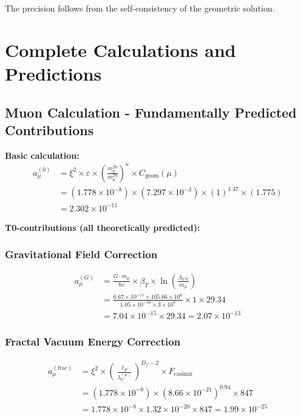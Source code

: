 \documentclass[12pt,a4paper]{article}
\numberwithin{equation}{section}
\newcommand{\xipar}{\xi}
\newcommand{\epsilonT}{\varepsilon}
\newcommand{\Cgeom}{C_{\text{geom}}}
\newcommand{\kappaT}{\kappa}
\newcommand{\Df}{D_f}
\newcommand{\lP}{\ell_P}
\newcommand{\lambdaC}{\lambda_C}
\begin{document}
	The precision follows from the self-consistency of the geometric solution.
	
	\section{Complete Calculations and Predictions}
	
	\subsection{Muon Calculation - Fundamentally Predicted Contributions}
	
	\textbf{Basic calculation:}
	\begin{align}
		a_\mu^{(0)} &= \xipar^2 \times \epsilonT \times \left(\frac{m_\mu^{T0}}{m_\mu^{T0}}\right)^{\kappaT} \times \Cgeom(\mu)\\
		&= (1.778 \times 10^{-8}) \times (7.297 \times 10^{-3}) \times (1)^{1.47} \times (1.775)\\
		&= 2.302 \times 10^{-11}
		\label{eq:muon_basic}
	\end{align}
	
	\textbf{T0-contributions (all theoretically predicted):}
	
	\subsubsection{Gravitational Field Correction}
	\begin{align}
		a_\mu^{(G)} &= \frac{G \cdot m_\mu}{\hbar c} \times \beta_T \times \ln\left(\frac{\Lambda_{\text{UV}}}{m_\mu}\right)\\
		&= \frac{6.67 \times 10^{-11} \times 105.66 \times 10^6}{1.05 \times 10^{-34} \times 3 \times 10^8} \times 1 \times 29.34\\
		&= 7.04 \times 10^{-15} \times 29.34 = 2.07 \times 10^{-13}
		\label{eq:muon_gravity}
	\end{align}
	
	\subsubsection{Fractal Vacuum Energy Correction}
	\begin{align}
		a_\mu^{(\text{frac})} &= \xipar^2 \times \left(\frac{\lP}{\lambdaC^{(\mu)}}\right)^{\Df-2} \times F_{\text{casimir}}\\
		&= (1.778 \times 10^{-8}) \times (8.66 \times 10^{-21})^{0.94} \times 847\\
		&= 1.778 \times 10^{-8} \times 1.32 \times 10^{-20} \times 847 = 1.99 \times 10^{-25}
		\label{eq:muon_fractal}
	\end{align}
	
\end{document}
